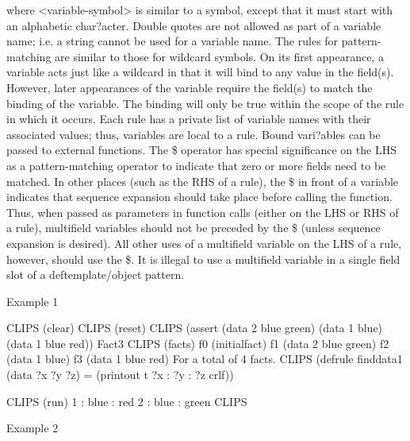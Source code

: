 \documentclass[letterpaper,10pt,english]{sphinxmanual}
\begin{document}
where \textless{}variable-symbol\textgreater{} is similar to a symbol, except that it must
start with an alphabetic char?acter. Double quotes are not allowed as
part of a variable name; i.e. a string cannot be used for a variable
name. The rules for pattern-matching are similar to those for wildcard
symbols. On its first appearance, a variable acts just like a wildcard
in that it will bind to any value in the field(s). However, later
appearances of the variable require the field(s) to match the binding of
the variable. The binding will only be true within the scope of the rule
in which it occurs. Each rule has a private list of variable names with
their associated values; thus, variables are local to a rule. Bound
vari?ables can be passed to external functions. The \$ operator has
special significance on the LHS as a pattern-matching operator to
indicate that zero or more fields need to be matched. In other places
(such as the RHS of a rule), the \$ in front of a variable indicates that
sequence expansion should take place before calling the function. Thus,
when passed as parameters in function calls (either on the LHS or RHS of
a rule), multifield variables should not be preceded by the \$ (unless
sequence expansion is desired). All other uses of a multifield variable
on the LHS of a rule, however, should use the \$. It is illegal to use a
multifield variable in a single field slot of a deftemplate/object
pattern.

Example 1

\begin{sphinxVerbatim}[commandchars=\\\{\}]
CLIPS\PYGZgt{} (clear)
CLIPS\PYGZgt{} (reset)
CLIPS\PYGZgt{} (assert (data 2 blue green)
(data 1 blue)
(data 1 blue red))
\PYGZlt{}Fact\PYGZhy{}3\PYGZgt{}
CLIPS\PYGZgt{} (facts)
f\PYGZhy{}0 (initial\PYGZhy{}fact)
f\PYGZhy{}1 (data 2 blue green)
f\PYGZhy{}2 (data 1 blue)
f\PYGZhy{}3 (data 1 blue red)
For a total of 4 facts.
CLIPS\PYGZgt{}
(defrule find\PYGZhy{}data\PYGZhy{}1
  (data ?x ?y ?z)
  =\PYGZgt{}
  (printout t ?x \PYGZdq{} : \PYGZdq{} ?y \PYGZdq{} : \PYGZdq{} ?z crlf))

CLIPS\PYGZgt{} (run)
1 : blue : red
2 : blue : green
CLIPS\PYGZgt{}
\end{sphinxVerbatim}

Example 2
\end{document}
